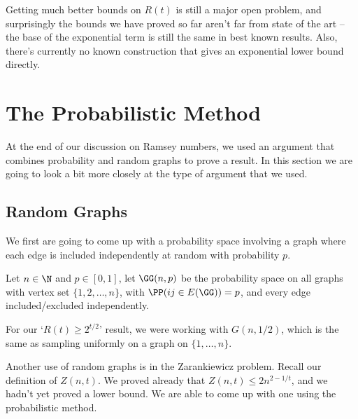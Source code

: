 Getting much better bounds on $R(t)$ is still a major open problem, and surprisingly the bounds we have proved so far aren't far from state of the art -- the base of the exponential term is still the same in best known results. Also, there's currently no known construction that gives an exponential lower bound directly.

\section{The Probabilistic Method}

At the end of our discussion on Ramsey numbers, we used an argument that combines probability and random graphs to prove a result. In this section we are going to look a bit more closely at the type of argument that we used.

\subsection{Random Graphs}

We first are going to come up with a probability space involving a graph where each edge is included independently at random with probability $p$.

\begin{definition}
	Let $n \in \N$ and $p \in [0, 1]$, let $\GG(n, p)$ be the probability space on all graphs with vertex set $\{1, 2, \dots, n\}$, with $\PP(ij \in E(\GG)) = p$, and every edge included/excluded independently.
\end{definition}

\begin{remark}
	For our `$R(t) \geq 2^{t/2}$' result, we were working with $G(n, 1/2)$, which is the same as sampling uniformly on a graph on $\{1, \dots, n\}$.
\end{remark}

Another use of random graphs is in the Zarankiewicz problem. Recall our definition of $Z(n, t)$. We proved already that $Z(n, t) \leq 2 n^{2 - 1/t}$, and we hadn't yet proved a lower bound. We are able to come up with one using the probabilistic method.

